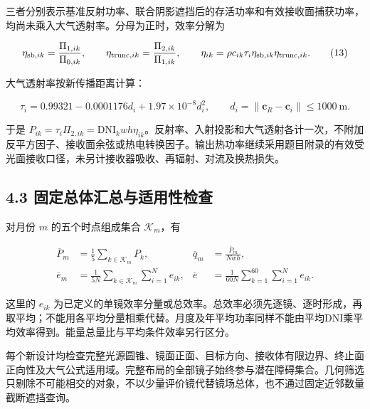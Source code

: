 \documentclass[UTF8,fontset=windows,zihao=-4]{ctexart}
\begin{document}
\par\noindent\begin{minipage}{\linewidth}
三者分别表示基准反射功率、联合阴影遮挡后的存活功率和有效接收面捕获功率，均尚未乘入大气透射率。分母为正时，效率分解为

\[
\eta_{{\rm sb},ik}=\frac{\Pi_{1,ik}}{\Pi_{0,ik}},\qquad
\eta_{{\rm trunc},ik}=\frac{\Pi_{2,ik}}{\Pi_{1,ik}},\qquad
\eta_{ik}=\rho c_{ik}\tau_i\eta_{{\rm sb},ik}\eta_{{\rm trunc},ik}.
\tag{13}
\]
\end{minipage}\par

\par\noindent\begin{minipage}{\linewidth}
大气透射率按新传播距离计算：

\[
\tau_i=0.99321-0.0001176d_i+1.97\times10^{-8}d_i^2,
\qquad d_i=\|\boldsymbol c_R-\boldsymbol c_i\|\le1000\ \mathrm m.
\tag{14}
\]
\end{minipage}\par

于是 \(P_{ik}=\tau_i\Pi_{2,ik}=\mathrm{DNI}_kwh\eta_{ik}\)。反射率、入射投影和大气透射各计一次，不附加反平方因子、接收面余弦或热电转换因子。输出热功率继续采用题目附录的有效受光面接收口径，未另计接收器吸收、再辐射、对流及换热损失。

\subsection*{4.3 固定总体汇总与适用性检查}

\par\noindent\begin{minipage}{\linewidth}
对月份 \(m\) 的五个时点组成集合 \(\mathcal K_m\)，有

\[
\begin{aligned}
\overline P_m&=\frac15\sum_{k\in\mathcal K_m}P_k,
&\overline q_m&=\frac{\overline P_m}{Nwh},\\
\overline e_m&=\frac1{5N}\sum_{k\in\mathcal K_m}\sum_{i=1}^{N}e_{ik},
&\overline e&=\frac1{60N}\sum_{k=1}^{60}\sum_{i=1}^{N}e_{ik}.
\end{aligned}
\tag{15}
\]
\end{minipage}\par

这里的 \(e_{ik}\) 为已定义的单镜效率分量或总效率。总效率必须先逐镜、逐时形成，再取平均；不能用各平均分量相乘代替。月度及年平均功率同样不能由平均DNI乘平均效率得到。能量总量比与平均条件效率另行区分。

每个新设计均检查完整光源圆锥、镜面正面、目标方向、接收体有限边界、终止面正向性及大气公式适用域。完整布局的全部镜子始终参与潜在障碍集合。几何筛选只剔除不可能相交的对象，不以少量评价镜代替镜场总体，也不通过固定近邻数量截断遮挡查询。
\end{document}
